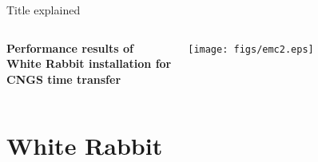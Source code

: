 \documentclass[compress,red]{beamer}
\begin{document}
\begin{frame}{Title explained}

\begin{columns}[c]
    \begin{center}
	\textbf{Performance results of \\White Rabbit installation for \\CNGS time transfer}
    \end{center}
    \begin{center}
      \texttt{[image: figs/emc2.eps]}
    \end{center}
\end{columns}

\end{frame}
\section{White Rabbit}
\end{document}
